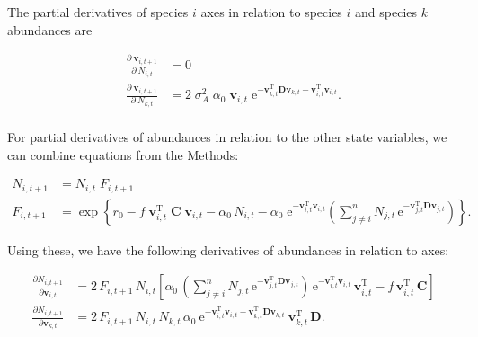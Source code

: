 The partial derivatives of species $i$ axes in relation to species $i$ 
and species $k$ abundances are

\begin{equation*}
\begin{split}
    \frac{ \partial \: \mathbf{v}_{i,t+1} }{ \partial \: N_{i,t} } &= 0 \\
    \frac{ \partial \: \mathbf{v}_{i,t+1} }{ \partial \: N_{k,t} } &=
        2 \; \sigma_A^2 \; \alpha_0 \; \mathbf{v}_{i,t} \;
        \textrm{e}^{ - \mathbf{v}_{k,t}^{\textrm{T}} \mathbf{D} \mathbf{v}_{k,t}
            - \mathbf{v}_{i,t}^{\textrm{T}} \mathbf{v}_{i,t} }
    \textrm{.} \\
\end{split}
\end{equation*}




For partial derivatives of abundances in relation to the other state variables,
we can combine equations from the Methods:

\begin{equation} \label{eq:fitness-full}
\begin{split}
    N_{i,t+1} &= N_{i,t} \; F_{i,t+1} \\
    F_{i,t+1} &= \exp \left\{
        r_0 - f \; \mathbf{v}_{i,t}^{\textrm{T}} \; \mathbf{C} \; \mathbf{v}_{i,t} -
        \alpha_0 \, N_{i,t} -
        \alpha_0 \;\textrm{e}^{- \mathbf{v}_{i,t}^{\textrm{T}} \mathbf{v}_{i,t} } \left( 
            \sum_{j \ne i}^{n}{ N_{j,t} \, \textrm{e}^{
                - \mathbf{v}_{j,t}^{\textrm{T}}
                \mathbf{D} \mathbf{v}_{j,t} } }
        \right)
        \right\}
    \textrm{.}
\end{split}
\end{equation}





Using these, we have the following derivatives of abundances in relation
to axes:

\begin{equation*}
\begin{split}
    \frac{ \partial N_{i,t+1} }{ \partial \mathbf{v}_{i,t} } &= 
        2 \, F_{i,t+1} \,  N_{i,t}
        \left[
            \alpha_0 \, 
            \left( 
                \sum_{j \ne i}^{n}{ N_{j,t} \, \textrm{e}^{
                    - \mathbf{v}_{j,t}^{\textrm{T}}
                    \mathbf{D} \mathbf{v}_{j,t} } }
            \right)
            \, \text{e}^{ -\mathbf{v}_{i,t}^{\text{T}}
            \mathbf{v}_{i,t} } \, \mathbf{v}_{i,t}^{\text{T}}
            - f \, \mathbf{v}_{i,t}^{\text{T}} \, \mathbf{C}
        \right] \\
    \frac{ \partial N_{i,t+1} }{ \partial \mathbf{v}_{k,t} } &= 
        2 \, F_{i,t+1} \, N_{i,t} \, N_{k,t} \, \alpha_0 \: 
        \text{e}^{ -\mathbf{v}_{i,t}^{\text{T}} \mathbf{v}_{i,t} -
            \mathbf{v}_{k,t}^{\text{T}} \mathbf{D} \mathbf{v}_{k,t} } \:
        \mathbf{v}_{k,t}^{\text{T}} \, \mathbf{D}
    \textrm{.}
\end{split}
\end{equation*}

